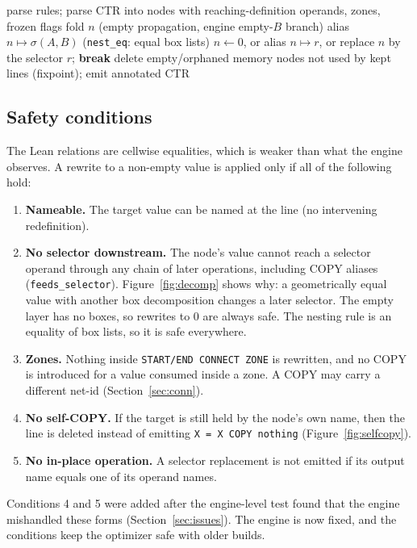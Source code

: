 \documentclass[11pt]{article}
\begin{document}
\begin{algorithm}[t]
\caption{TRS pass (\texttt{TRSOptimizeFile})}\label{alg:trs}
\begin{algorithmic}[1]
\STATE parse rules; parse CTR into nodes with reaching-definition operands, zones, frozen flags
   \STATE fold $n$ (empty propagation, engine empty-$B$ branch)
   \STATE alias $n\mapsto\sigma(A,B)$ \hfill (\texttt{nest\_eq}: equal box lists)
  \ELSE
        \STATE $n \gets 0$, or alias $n\mapsto r$, or replace $n$ by the selector $r$; \textbf{break}
      \ENDIF
    \ENDFOR
  \ENDIF
\ENDFOR
\STATE delete empty/orphaned memory nodes not used by kept lines (fixpoint); emit annotated CTR
\end{algorithmic}
\end{algorithm}

\subsection{Safety conditions}
The Lean relations are cellwise equalities, which is weaker than what the engine observes. A rewrite to a non-empty value is applied only if all of the following hold:
\begin{enumerate}
\item \textbf{Nameable.} The target value can be named at the line (no intervening redefinition).
\item \textbf{No selector downstream.} The node's value cannot reach a selector operand through any chain of later operations, including COPY aliases (\texttt{feeds\_selector}). Figure~\ref{fig:decomp} shows why: a geometrically equal value with another box decomposition changes a later selector. The empty layer has no boxes, so rewrites to $0$ are always safe. The nesting rule is an equality of box lists, so it is safe everywhere.
\item \textbf{Zones.} Nothing inside \texttt{START/END CONNECT ZONE} is rewritten, and no COPY is introduced for a value consumed inside a zone. A COPY may carry a different net-id (Section~\ref{sec:conn}).
\item \textbf{No self-COPY.} If the target is still held by the node's own name, then the line is deleted instead of emitting \texttt{X = X COPY nothing} (Figure~\ref{fig:selfcopy}).
\item \textbf{No in-place operation.} A selector replacement is not emitted if its output name equals one of its operand names.
\end{enumerate}
Conditions 4 and 5 were added after the engine-level test found that the engine mishandled these forms (Section~\ref{sec:issues}). The engine is now fixed, and the conditions keep the optimizer safe with older builds.
\end{document}
